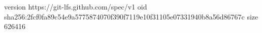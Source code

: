 version https://git-lfs.github.com/spec/v1
oid sha256:2fcf0fa89c54e9a5775874070f390f7119e10f31105e07331940b8a56d86767c
size 626416
